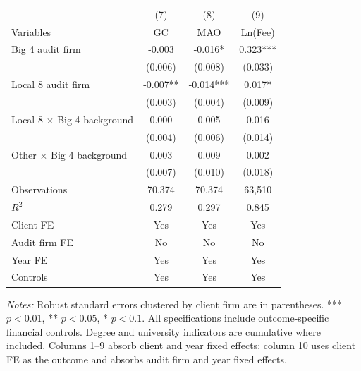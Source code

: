 \documentclass[10pt]{article}
\begin{document}
\begin{minipage}{19cm}\fontsize{10}{12}\selectfont\setlength{\tabcolsep}{4pt}\renewcommand{\arraystretch}{1.12}


\centering
{}
\begin{threeparttable}
\begin{tabular}{p{}ccc}
\toprule
 & (7) & (8) & (9) \\
Variables & GC & MAO & Ln(Fee) \\
\midrule
Big 4 audit firm & -0.003 & -0.016* & 0.323*** \\
 & (0.006) & (0.008) & (0.033) \\
Local 8 audit firm & -0.007** & -0.014*** & 0.017* \\
 & (0.003) & (0.004) & (0.009) \\
Local 8 $\times$ Big 4 background & 0.000 & 0.005 & 0.016 \\
 & (0.004) & (0.006) & (0.014) \\
Other $\times$ Big 4 background & 0.003 & 0.009 & 0.002 \\
 & (0.007) & (0.010) & (0.018) \\
Observations & 70,374 & 70,374 & 63,510 \\
$R^{2}$ & 0.279 & 0.297 & 0.845 \\
Client FE & Yes & Yes & Yes \\
Audit firm FE & No & No & No \\
Year FE & Yes & Yes & Yes \\
Controls & Yes & Yes & Yes \\
\bottomrule
\end{tabular}
\begin{tablenotes}\fontsize{9}{11}\selectfont
\item \raggedright \fontsize{9}{11}\selectfont \textit{Notes:} Robust standard errors clustered by client firm are in parentheses. *** $p<0.01$, ** $p<0.05$, * $p<0.1$. All specifications include outcome-specific financial controls. Degree and university indicators are cumulative where included.
Columns 1--9 absorb client and year fixed effects; column 10 uses client FE as the outcome and absorbs audit firm and year fixed effects.
\end{tablenotes}
\end{threeparttable}

\end{minipage}
\end{document}
